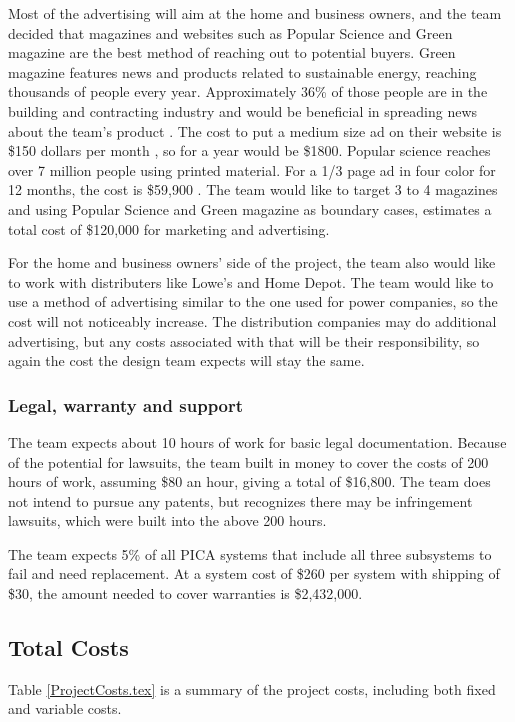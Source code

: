 Most of the advertising will aim at the home and business owners, and the team decided that magazines and websites such as Popular Science and Green magazine are the best method of reaching out to potential buyers.  Green magazine features news and products related to sustainable energy, reaching thousands of people every year. Approximately 36\% of those people are in the building and contracting industry and would be beneficial in spreading news about the team's product \cite{GreenMediaKit}. The cost to put a medium size ad on their website is \$150 dollars per month \cite{GreenMediaKit}, so for a year would be \$1800. Popular science reaches over 7 million people using printed material. For a 1/3 page ad in four color for 12 months, the cost is \$59,900 \cite{PopSci}. The team would like to target 3 to 4 magazines and using Popular Science and Green magazine as boundary cases, estimates a total cost of \$120,000 for marketing and advertising. 

For the home and business owners' side of the project, the team also would like to work with distributers like Lowe's and Home Depot. The team would like to use a method of advertising similar to the one used for power companies, so the cost will not noticeably increase. The distribution companies may do additional advertising, but any costs associated with that will be their responsibility, so again the cost the design team expects will stay the same.

\subsubsection{Legal, warranty and support}
The team  expects about 10 hours of work for basic legal documentation. Because of the potential for lawsuits, the team built in money to cover the costs of 200 hours of work, assuming \$80 an hour, giving a total of \$16,800. The team does not intend to pursue any patents, but recognizes there may be infringement lawsuits, which were built into the above 200 hours.

The team expects 5\% of all PICA systems that include all three subsystems to fail and need replacement. At a system cost of \$260 per system with shipping of \$30, the amount needed to cover warranties is \$2,432,000.
\subsection{Total Costs}
Table \ref{ProjectCosts.tex} is a summary of the project costs, including both fixed and variable costs.


